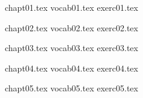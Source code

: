 \documentclass[12pt]{book}
\begin{document}
%
%
%

{chapt01.tex}
{vocab01.tex}
{exerc01.tex}

{chapt02.tex}
{vocab02.tex}
{exerc02.tex}

{chapt03.tex}
{vocab03.tex}
{exerc03.tex}

{chapt04.tex}
{vocab04.tex}
{exerc04.tex}


{chapt05.tex}
{vocab05.tex}
{exerc05.tex}

%
%
%
%
%
%
%
%
%
%
%
%
%
%
%
%
%
%
%
\end{document}
